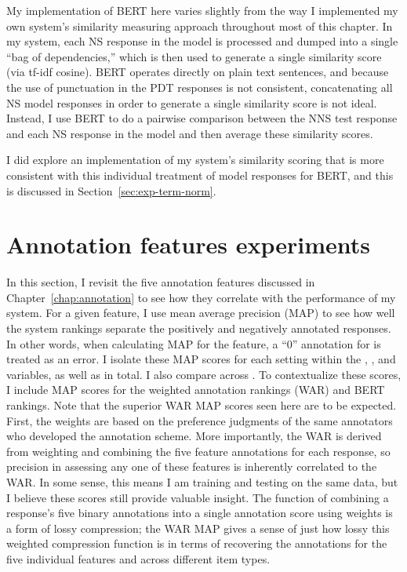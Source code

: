 My implementation of BERT here varies slightly from the way I implemented my own system's similarity measuring approach throughout most of this chapter. In my system, each NS response in the model is processed and dumped into a single ``bag of dependencies,'' which is then used to generate a single similarity score (via tf-idf cosine). BERT operates directly on plain text sentences, and because the use of punctuation in the PDT responses is not consistent, concatenating all NS model responses in order to generate a single similarity score is not ideal. Instead, I use BERT to do a pairwise comparison between the NNS test response and each NS response in the model and then average these similarity scores.

I did explore an implementation of my system's similarity scoring that is more consistent with this individual treatment of model responses for BERT, and this is discussed in Section~\ref{sec:exp-term-norm}.


\section{Annotation features experiments}
\label{sec:exp-annotations}
In this section, I revisit the five annotation features discussed in Chapter~\ref{chap:annotation} to see how they correlate with the performance of my system. For a given feature, I use mean average precision (MAP) to see how well the system rankings separate the positively and negatively annotated responses. In other words, when calculating MAP for the  feature, a ``0'' annotation for  is treated as an error. I isolate these MAP scores for each setting within the , , and  variables, as well as in total. I also compare across . To contextualize these scores, I include MAP scores for the weighted annotation rankings (WAR) and BERT rankings. Note that the superior WAR MAP scores seen here are to be expected. First, the weights are based on the preference judgments of the same annotators who developed the annotation scheme. More importantly, the WAR is derived from weighting and combining the five feature annotations for each response, so precision in assessing any one of these features is inherently correlated to the WAR. In some sense, this means I am training and testing on the same data, but I believe these scores still provide valuable insight. The function of combining a response's five binary annotations into a single annotation score using weights is a form of lossy compression; the WAR MAP gives a sense of just how lossy this weighted compression function is in terms of recovering the annotations for the five individual features and across different item types. 

